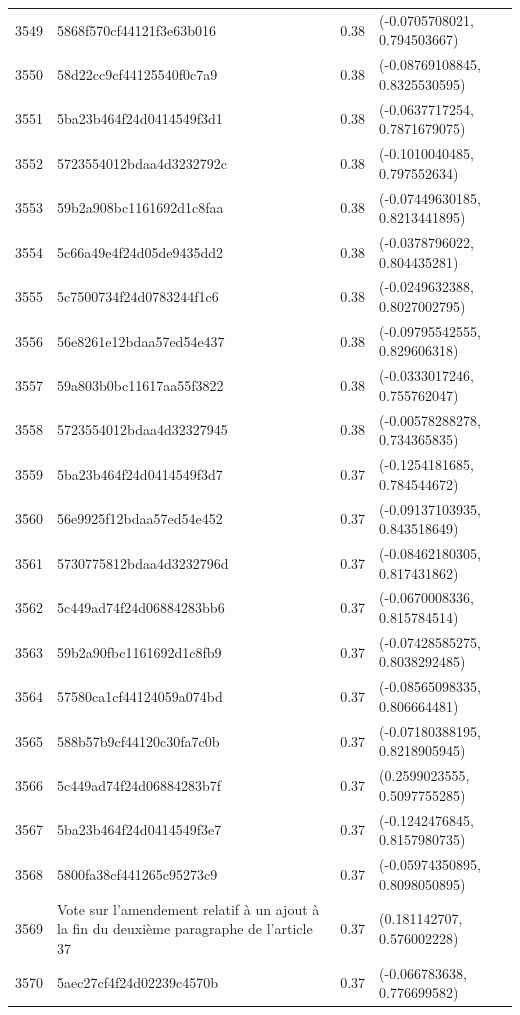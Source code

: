 \begin{table}[ht]
\begin{tabular}{rlrl}
  3549 & 5868f570cf44121f3e63b016 & 0.38 & (-0.0705708021, 0.794503667) \\ 
  3550 & 58d22cc9cf44125540f0c7a9 & 0.38 & (-0.08769108845, 0.8325530595) \\ 
  3551 & 5ba23b464f24d0414549f3d1 & 0.38 & (-0.0637717254, 0.7871679075) \\ 
  3552 & 5723554012bdaa4d3232792c & 0.38 & (-0.1010040485, 0.797552634) \\ 
  3553 & 59b2a908bc1161692d1c8faa & 0.38 & (-0.07449630185, 0.8213441895) \\ 
  3554 & 5c66a49e4f24d05de9435dd2 & 0.38 & (-0.0378796022, 0.804435281) \\ 
  3555 & 5c7500734f24d0783244f1c6 & 0.38 & (-0.0249632388, 0.8027002795) \\ 
  3556 & 56e8261e12bdaa57ed54e437 & 0.38 & (-0.09795542555, 0.829606318) \\ 
  3557 & 59a803b0bc11617aa55f3822 & 0.38 & (-0.0333017246, 0.755762047) \\ 
  3558 & 5723554012bdaa4d32327945 & 0.38 & (-0.00578288278, 0.734365835) \\ 
  3559 & 5ba23b464f24d0414549f3d7 & 0.37 & (-0.1254181685, 0.784544672) \\ 
  3560 & 56e9925f12bdaa57ed54e452 & 0.37 & (-0.09137103935, 0.843518649) \\ 
  3561 & 5730775812bdaa4d3232796d & 0.37 & (-0.08462180305, 0.817431862) \\ 
  3562 & 5c449ad74f24d06884283bb6 & 0.37 & (-0.0670008336, 0.815784514) \\ 
  3563 & 59b2a90fbc1161692d1c8fb9 & 0.37 & (-0.07428585275, 0.8038292485) \\ 
  3564 & 57580ca1cf44124059a074bd & 0.37 & (-0.08565098335, 0.806664481) \\ 
  3565 & 588b57b9cf44120c30fa7c0b & 0.37 & (-0.07180388195, 0.8218905945) \\ 
  3566 & 5c449ad74f24d06884283b7f & 0.37 & (0.2599023555, 0.5097755285) \\ 
  3567 & 5ba23b464f24d0414549f3e7 & 0.37 & (-0.1242476845, 0.8157980735) \\ 
  3568 & 5800fa38cf441265c95273c9 & 0.37 & (-0.05974350895, 0.8098050895) \\ 
  3569 & Vote sur l'amendement relatif à un ajout à la fin du deuxième paragraphe de l'article 37 & 0.37 & (0.181142707, 0.576002228) \\ 
  3570 & 5aec27cf4f24d02239c4570b & 0.37 & (-0.066783638, 0.776699582) \\ 

\end{tabular}
\end{table}
